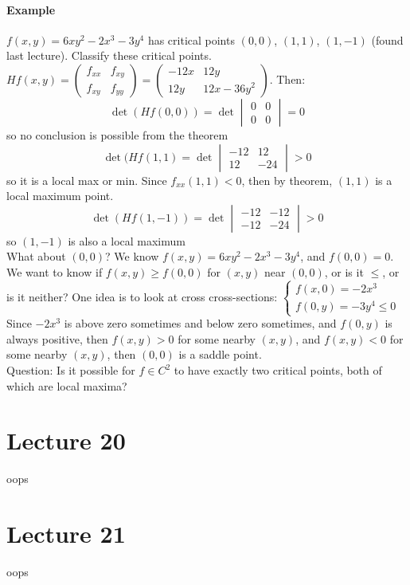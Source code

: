 \documentclass[tikz,10pt,letter]{article}
\theoremstyle{plain}
\theoremstyle{definition}
\begin{document}
\paragraph{Example}
$f(x,y)=6xy^2-2x^3-3y^4$ has critical points $(0,0)$, $(1,1)$, $(1,-1)$ (found last lecture). Classify these critical points. $Hf(x,y)=\begin{pmatrix}f_{xx}&f_{xy}\\f_{xy}&f_{yy}\end{pmatrix}=\begin{pmatrix}-12x&12y\\12y&12x-36y^2\end{pmatrix}$. Then: 
$$\det(Hf(0,0))=\det\begin{vmatrix}0&0\\0&0\end{vmatrix}=0$$ so no conclusion is possible from the theorem
$$\det(Hf(1,1)=\det\begin{vmatrix}-12&12\\12&-24\end{vmatrix}>0$$ so it is a local max or min. Since $f_{xx}(1,1)<0$, then by theorem, $(1,1)$ is a local maximum point. 
$$\det(Hf(1,-1))=\det\begin{vmatrix}-12&-12\\-12&-24\end{vmatrix}>0$$ so $(1,-1)$ is also a local maximum\\ What about $(0,0)$? We know $f(x,y)=6xy^2-2x^3-3y^4$, and $f(0,0)=0$. We want to know if $f(x,y)\geq f(0,0)$ for $(x,y)$ near $(0,0)$, or is it $\leq$, or is it neither? One idea is to look at cross cross-sections: $\begin{cases}f(x,0)=-2x^3\\f(0,y)=-3y^4\leq0\end{cases}$ Since $-2x^3$ is above zero sometimes and below zero sometimes, and $f(0,y)$ is always positive, then $f(x,y)>0$ for some nearby $(x,y)$, and $f(x,y)<0$ for some nearby $(x,y)$, then $(0,0)$ is a saddle point. \\ 
Question: Is it possible for $f\in C^2$ to have exactly two critical points, both of which are local maxima?

\section*{Lecture 20}
oops
\section*{Lecture 21}
oops
\end{document}
